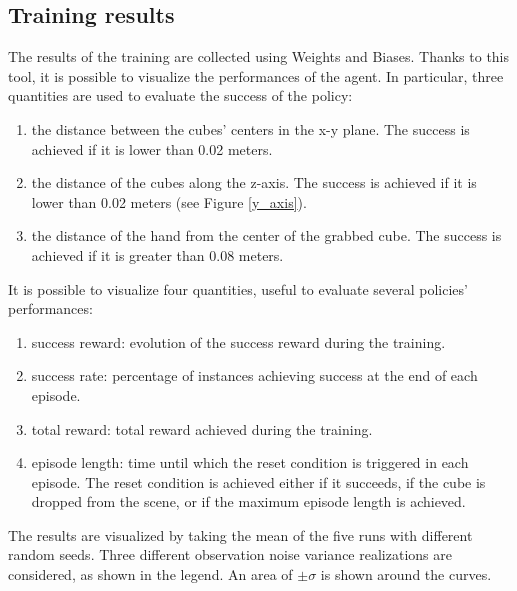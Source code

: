 \documentclass[a4paper]{article}
\begin{document}
%

\subsection{Training results}
The results of the training are collected using Weights and Biases. Thanks to this tool, it is possible to visualize the performances of the agent. In particular, three quantities are used to evaluate the success of the policy:
\begin{enumerate}
    \item the distance between the cubes' centers in the x-y plane. The success is achieved if it is lower than 0.02 meters.
    \item the distance of the cubes along the z-axis. The success is achieved if it is lower than 0.02 meters (see Figure \ref{y_axis}).
    \item the distance of the hand from the center of the grabbed cube. The success is achieved if it is greater than 0.08 meters.
\end{enumerate}

It is possible to visualize four quantities, useful to evaluate several policies' performances:
\begin{enumerate}
    \item success reward: evolution of the success reward during the training.
    \item success rate: percentage of instances achieving success at the end of each episode.
    \item total reward: total reward achieved during the training.
    \item episode length: time until which the reset condition is triggered in each episode. The reset condition is achieved either if it succeeds, if the cube is dropped from the scene, or if the maximum episode length is achieved.
\end{enumerate}

The results are visualized by taking the mean of the five runs with different random seeds. Three different observation noise variance realizations are considered, as shown in the legend. An area of $\pm\sigma$ is shown around the curves.
\end{document}
